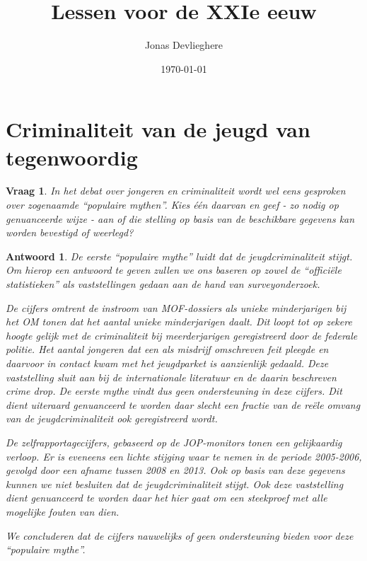 \documentclass{article}
\title{Lessen voor de XXIe eeuw}
\date{\today}
\author{Jonas Devlieghere}
\theoremstyle{plain}
\newtheorem{question}{Vraag}
\theoremstyle{nonumberplain}
\newtheorem{answer}{Antwoord}
\begin{document}
\maketitle
\tableofcontents
\newpage

\section{Criminaliteit van de jeugd van tegenwoordig}

\begin{question}
In het debat over jongeren en criminaliteit wordt wel eens gesproken over
zogenaamde ``populaire mythen''. Kies één daarvan en geef - zo nodig op
genuanceerde wijze - aan of die stelling op basis van de beschikbare gegevens
kan worden bevestigd of weerlegd?
\end{question}

\begin{answer}

De eerste ``populaire mythe'' luidt dat de jeugdcriminaliteit stijgt. Om hierop
een antwoord te geven zullen we ons baseren op zowel de ``officiële
statistieken'' als vaststellingen gedaan aan de hand van surveyonderzoek.

De cijfers omtrent de instroom van MOF-dossiers als unieke minderjarigen bij het
OM tonen dat het aantal unieke minderjarigen daalt. Dit loopt tot op zekere
hoogte gelijk met de criminaliteit bij meerderjarigen geregistreerd door de
federale politie. Het aantal jongeren dat een als misdrijf omschreven feit
pleegde en daarvoor in contact kwam met het jeugdparket is aanzienlijk gedaald.
Deze vaststelling sluit aan bij de internationale literatuur en de daarin
beschreven crime drop. De eerste mythe vindt dus geen ondersteuning in deze
cijfers. Dit dient uiteraard genuanceerd te worden daar slecht een fractie van
de reële omvang van de jeugdcriminaliteit  ook geregistreerd wordt.

De zelfrapportagecijfers, gebaseerd op de JOP-monitors tonen een gelijkaardig
verloop. Er is eveneens een lichte stijging waar te nemen in de periode
2005-2006, gevolgd door een afname tussen 2008 en 2013. Ook op basis van deze
gegevens kunnen we niet besluiten dat de jeugdcriminaliteit stijgt. Ook deze
vaststelling dient genuanceerd te worden daar het hier gaat om een steekproef
met alle mogelijke fouten van dien.

We concluderen dat de cijfers nauwelijks of geen ondersteuning bieden voor deze
``populaire mythe''.

\end{answer}
\end{document}
